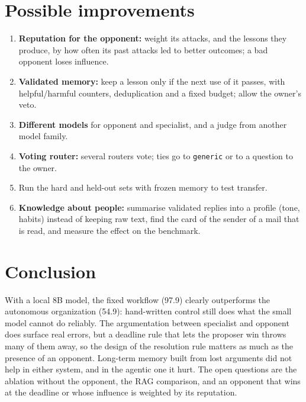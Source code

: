 \documentclass[11pt,a4paper]{article}
\newcommand{\code}[1]{\texttt{#1}}
\begin{document}
\section{Possible improvements}
\begin{enumerate}
  \item \textbf{Reputation for the opponent:} weight its attacks, and the lessons they
        produce, by how often its past attacks led to better outcomes; a bad opponent loses influence.
  \item \textbf{Validated memory:} keep a lesson only if the next use of it passes, with helpful/harmful counters,
        deduplication and a fixed budget; allow the owner's veto.
  \item \textbf{Different models} for opponent and specialist, and a judge from another model family.
  \item \textbf{Voting router:} several routers vote; ties go to \code{generic} or to a
        question to the owner.
  \item Run the hard and held-out sets with frozen memory to test transfer.
  \item \textbf{Knowledge about people:} summarise validated replies into a profile (tone, habits) instead of
        keeping raw text, find the card of the sender of a mail that is read, and measure the effect on the benchmark.
\end{enumerate}

\section{Conclusion}
With a local 8B model, the fixed workflow (97.9) clearly outperforms the autonomous organization (54.9): hand-written
control still does what the small model cannot do reliably. The argumentation between specialist and opponent does
surface real errors, but a deadline rule that lets the proposer win throws many of them away, so the design of the
resolution rule matters as much as the presence of an opponent. Long-term memory built from lost arguments did not
help in either system, and in the agentic one it hurt. The open questions are the ablation without the opponent,
the RAG comparison, and an opponent that wins at the deadline or whose influence is weighted by its reputation.

\end{document}
